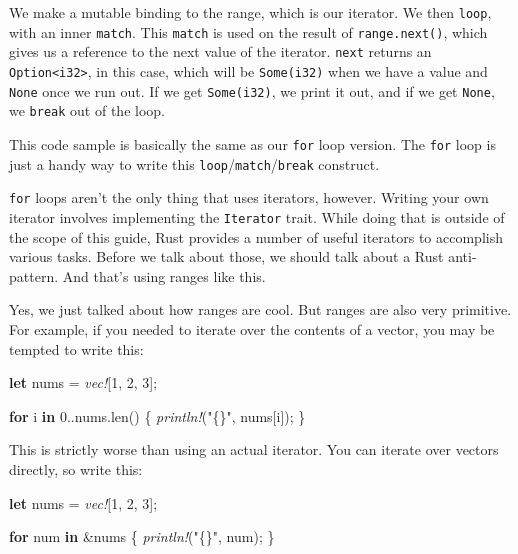 \documentclass[a4paper,]{book}
\newenvironment{Shaded}{\begin{snugshade}}{\end{snugshade}}
\newcommand{\KeywordTok}[1]{\textcolor[rgb]{0.13,0.29,0.53}{\textbf{{#1}}}}
\newcommand{\DecValTok}[1]{\textcolor[rgb]{0.00,0.00,0.81}{{#1}}}
\newcommand{\StringTok}[1]{\textcolor[rgb]{0.31,0.60,0.02}{{#1}}}
\newcommand{\PreprocessorTok}[1]{\textcolor[rgb]{0.56,0.35,0.01}{\textit{{#1}}}}
\newcommand{\NormalTok}[1]{{#1}}
\begin{document}
We make a mutable binding to the range, which is our iterator. We then
\texttt{loop}, with an inner \texttt{match}. This \texttt{match} is used
on the result of \texttt{range.next()}, which gives us a reference to
the next value of the iterator. \texttt{next} returns an
\texttt{Option\textless{}i32\textgreater{}}, in this case, which will be
\texttt{Some(i32)} when we have a value and \texttt{None} once we run
out. If we get \texttt{Some(i32)}, we print it out, and if we get
\texttt{None}, we \texttt{break} out of the loop.

This code sample is basically the same as our \texttt{for} loop version.
The \texttt{for} loop is just a handy way to write this
\texttt{loop}/\texttt{match}/\texttt{break} construct.

\texttt{for} loops aren't the only thing that uses iterators, however.
Writing your own iterator involves implementing the \texttt{Iterator}
trait. While doing that is outside of the scope of this guide, Rust
provides a number of useful iterators to accomplish various tasks.
Before we talk about those, we should talk about a Rust anti-pattern.
And that's using ranges like this.

Yes, we just talked about how ranges are cool. But ranges are also very
primitive. For example, if you needed to iterate over the contents of a
vector, you may be tempted to write this:

\begin{Shaded}
\begin{Highlighting}[]
\KeywordTok{let} \NormalTok{nums = }\PreprocessorTok{vec!}\NormalTok{[}\DecValTok{1}\NormalTok{, }\DecValTok{2}\NormalTok{, }\DecValTok{3}\NormalTok{];}

\KeywordTok{for} \NormalTok{i }\KeywordTok{in} \DecValTok{0.}\NormalTok{.nums.len() \{}
    \PreprocessorTok{println!}\NormalTok{(}\StringTok{"\{\}"}\NormalTok{, nums[i]);}
\NormalTok{\}}
\end{Highlighting}
\end{Shaded}

This is strictly worse than using an actual iterator. You can iterate
over vectors directly, so write this:

\begin{Shaded}
\begin{Highlighting}[]
\KeywordTok{let} \NormalTok{nums = }\PreprocessorTok{vec!}\NormalTok{[}\DecValTok{1}\NormalTok{, }\DecValTok{2}\NormalTok{, }\DecValTok{3}\NormalTok{];}

\KeywordTok{for} \NormalTok{num }\KeywordTok{in} \NormalTok{&nums \{}
    \PreprocessorTok{println!}\NormalTok{(}\StringTok{"\{\}"}\NormalTok{, num);}
\NormalTok{\}}
\end{Highlighting}
\end{Shaded}
\end{document}

